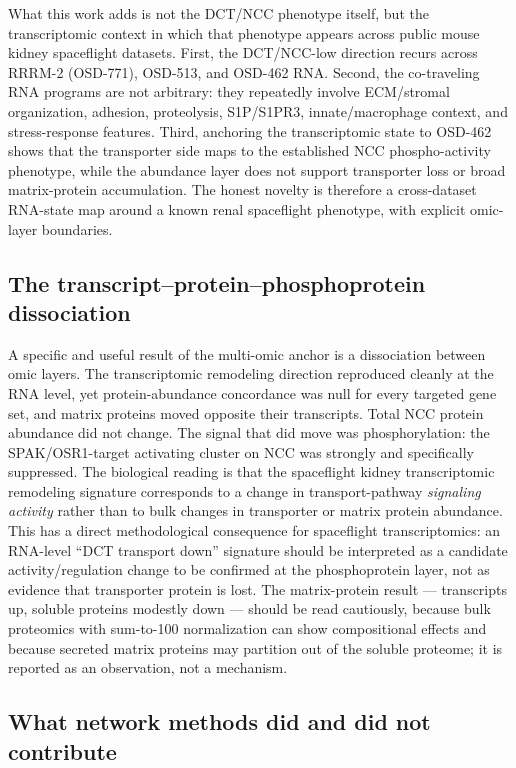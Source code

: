 \documentclass[11pt]{article}
\begin{document}
What this work adds is not the DCT/NCC phenotype itself, but the transcriptomic context in which that phenotype appears across public mouse kidney spaceflight datasets. First, the DCT/NCC-low direction recurs across RRRM-2 (OSD-771), OSD-513, and OSD-462 RNA. Second, the co-traveling RNA programs are not arbitrary: they repeatedly involve ECM/stromal organization, adhesion, proteolysis, S1P/S1PR3, innate/macrophage context, and stress-response features. Third, anchoring the transcriptomic state to OSD-462 shows that the transporter side maps to the established NCC phospho-activity phenotype, while the abundance layer does not support transporter loss or broad matrix-protein accumulation. The honest novelty is therefore a cross-dataset RNA-state map around a known renal spaceflight phenotype, with explicit omic-layer boundaries.

\subsection{The transcript--protein--phosphoprotein dissociation}

A specific and useful result of the multi-omic anchor is a dissociation between omic layers. The transcriptomic remodeling direction reproduced cleanly at the RNA level, yet protein-abundance concordance was null for every targeted gene set, and matrix proteins moved opposite their transcripts. Total NCC protein abundance did not change. The signal that did move was phosphorylation: the SPAK/OSR1-target activating cluster on NCC was strongly and specifically suppressed. The biological reading is that the spaceflight kidney transcriptomic remodeling signature corresponds to a change in transport-pathway \emph{signaling activity} rather than to bulk changes in transporter or matrix protein abundance. This has a direct methodological consequence for spaceflight transcriptomics: an RNA-level ``DCT transport down'' signature should be interpreted as a candidate activity/regulation change to be confirmed at the phosphoprotein layer, not as evidence that transporter protein is lost. The matrix-protein result --- transcripts up, soluble proteins modestly down --- should be read cautiously, because bulk proteomics with sum-to-100 normalization can show compositional effects and because secreted matrix proteins may partition out of the soluble proteome; it is reported as an observation, not a mechanism.

\subsection{What network methods did and did not contribute}
\end{document}
